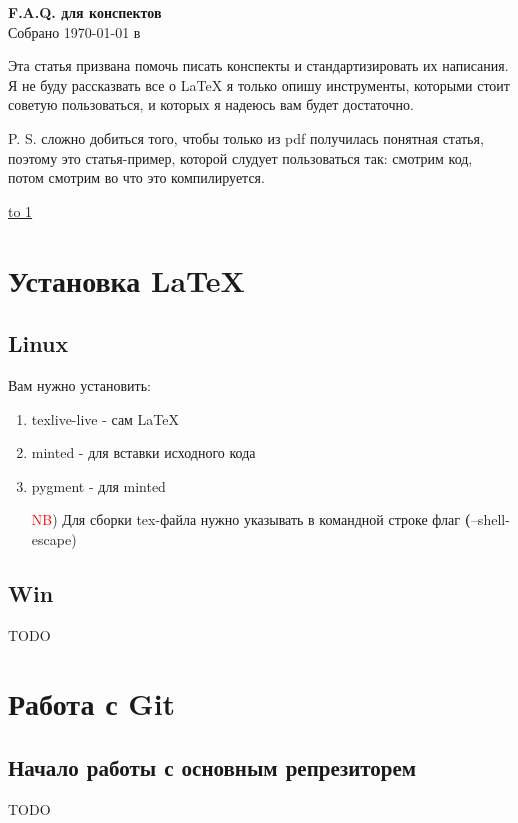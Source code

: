 \documentclass[12pt]{article}
\begin{document}
    \begin{center}

    {\Large \bf F.A.Q. для конспектов} \\
    \vspace{0.5em}
    {\large Собрано {\today} в {\currenttime}}

    Эта статья призвана помочь писать конспекты и стандартизировать их написания. Я не буду рассказвать все о LaTeX я только опишу инструменты, которыми стоит советую пользоваться, и которых я надеюсь вам будет достаточно.


    P. S. сложно добиться того, чтобы только из pdf получилась понятная статья, поэтому это статья-пример, которой слудует пользоваться так: смотрим код, потом смотрим во что это компилируется.

    \end{center}
\underline{\hbox to 1\textwidth{{ } \hfil{ } \hfil{ } }}

\tableofcontents

\newpage

\section{Установка LaTeX}

\subsection{Linux}

Вам нужно установить:
\begin{enumerate}
    \item texlive-live - сам LaTeX
    \item minted - для вставки исходного кода
    \item pygment - для minted

\textcolor{red}{NB}) Для сборки tex-файла нужно указывать в командной строке флаг \textbf(--shell-escape)
\end{enumerate}

\subsection{Win}
    TODO
\section{Работа с Git}
	\subsection{Начало работы с основным репрезиторем}
	TODO
\end{document}
